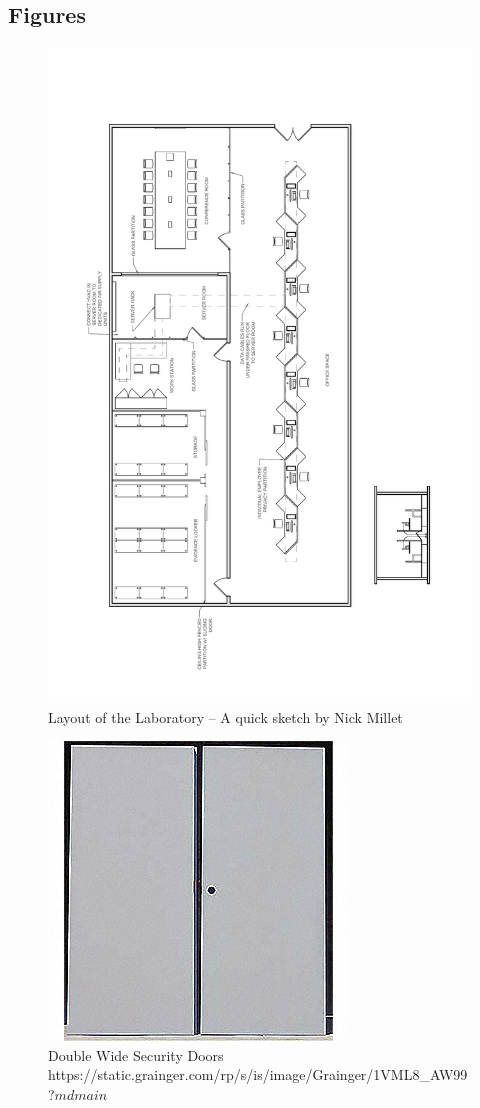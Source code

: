 \documentclass[12pt]{article}
\begin{document}
\subsection{Figures}
\begin{figure}[H]
   \centering
       \includegraphics[page=1,angle=180,width=.8\textwidth]{layout-thx-nick-millet.pdf}
 \caption{Layout of the Laboratory -- A quick sketch by Nick Millet}
 \label{fig:Layout}
\end{figure}
\begin{figure}[H]
	\captionsetup{justification=centering, margin=2cm}
	\centering
       \includegraphics{figures/doubledoor.jpg}
 	\caption{Double Wide Security Doors https://static.grainger.com/rp/s/is/image/Grainger/1VML8\_AW99?$mdmain$}
 \label{fig:Double Doors}
\end{figure}
\end{document}
